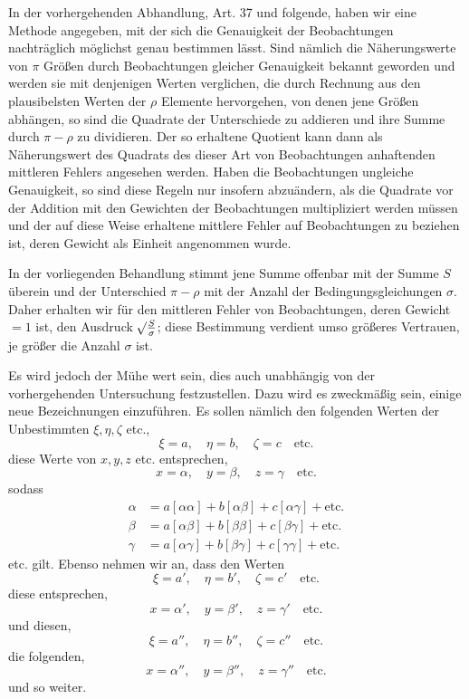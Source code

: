 In der vorhergehenden Abhandlung, Art. 37 und folgende, haben wir eine Methode angegeben, mit der sich die Genauigkeit der Beobachtungen nachträglich möglichst genau bestimmen lässt. Sind nämlich die Näherungswerte von \(\pi\) Größen durch Beobachtungen gleicher Genauigkeit bekannt geworden und werden sie mit denjenigen Werten verglichen, die durch Rechnung aus den plausibelsten Werten der \(\rho\) Elemente hervorgehen, von denen jene Größen abhängen, so sind die Quadrate der Unterschiede zu addieren und ihre Summe durch \(\pi-\rho\) zu dividieren. Der so erhaltene Quotient kann dann als Näherungswert des Quadrats des dieser Art von Beobachtungen anhaftenden mittleren Fehlers angesehen werden. Haben die Beobachtungen ungleiche Genauigkeit, so sind diese Regeln nur insofern abzuändern, als die Quadrate vor der Addition mit den Gewichten der Beobachtungen multipliziert werden müssen und der auf diese Weise erhaltene mittlere Fehler auf Beobachtungen zu beziehen ist, deren Gewicht als Einheit angenommen wurde.

In der vorliegenden Behandlung stimmt jene Summe offenbar mit der Summe \(S\) überein und der Unterschied \(\pi-\rho\) mit der Anzahl der Bedingungsgleichungen \(\sigma\). Daher erhalten wir für den mittleren Fehler von Beobachtungen, deren Gewicht \(=1\) ist, den Ausdruck \(\mathord{{}^{}\!\surd}\frac S\sigma\); diese Bestimmung verdient umso größeres Vertrauen, je größer die Anzahl \(\sigma\) ist.

Es wird jedoch der Mühe wert sein, dies auch unabhängig von der vorhergehenden Untersuchung festzustellen. Dazu wird es zweckmäßig sein, einige neue Bezeichnungen einzuführen. Es sollen nämlich den folgenden Werten der Unbestimmten \(\xi,\eta,\zeta\) etc.,
\[
\xi=a,\quad\eta=b,\quad\zeta=c\quad\text{etc.}
\]
diese Werte von \(x,y,z\) etc. entsprechen,
\[
x=\alpha,\quad y=\beta,\quad z=\gamma\quad\text{etc.}
\]
sodass
\[
\begin{aligned}
\alpha&=a[\alpha\alpha]+b[\alpha\beta]+c[\alpha\gamma]+\text{etc.}\\
\beta&=a[\alpha\beta]+b[\beta\beta]+c[\beta\gamma]+\text{etc.}\\
\gamma&=a[\alpha\gamma]+b[\beta\gamma]+c[\gamma\gamma]+\text{etc.}
\end{aligned}
\]
etc. gilt. Ebenso nehmen wir an, dass den Werten
\[
\xi=a',\quad\eta=b',\quad\zeta=c'\quad\text{etc.}
\]
diese entsprechen,
\[
x=\alpha',\quad y=\beta',\quad z=\gamma'\quad\text{etc.}
\]
und diesen,
\[
\xi=a'',\quad\eta=b'',\quad\zeta=c''\quad\text{etc.}
\]
die folgenden,
\[
x=\alpha'',\quad y=\beta'',\quad z=\gamma''\quad\text{etc.}
\]
und so weiter.

